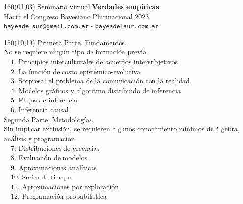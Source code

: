 \documentclass[shownotes,aspectratio=169]{beamer}
\begin{document}
\begin{frame}

\begin{textblock}{160}(01,03)\centering
\textcolor{black!85}{{\large
\large Seminario virtual \textbf{Verdades empíricas} \\[-0.1cm] \footnotesize Hacia el Congreso Bayesiano Plurinacional 2023}} \\ \scriptsize \texttt{bayesdelsur@gmail.com.ar} - \texttt{bayesdelsur.com.ar}
\end{textblock}



\begin{textblock}{150}(10,19)
\normalsize Primera Parte. Fundamentos. \\
\scriptsize No se requiere ningún tipo de formación previa \\[0.15cm] \footnotesize
\ \ $1$. Principios interculturales de acuerdos intersubjetivos \\
\ \ $2$. La función de costo epistémico-evolutiva\\
\ \ $3$. Sorpresa: el problema de la comunicación con la realidad \\
\ \ $4$. Modelos gráficos y algoritmo distribuido de inferencia\\
\ \ $5$. Flujos de inferencia \\
\ \ $6$. Inferencia causal \\[0.4cm]
\normalsize Segunda Parte. Metodologías.\scriptsize \\ Sin implicar exclusión, se requieren algunos conocimiento mínimos de álgebra, análisis y programación. \\[0.15cm] \footnotesize
\ \ $7$. Distribuciones de creencias \\
\ \ $8$. Evaluación de modelos \\
\ \ $9$. Aproximaciones analíticas \\
\ \ $10$. Series de tiempo\\
\ \ $11$. Aproximaciones por exploración \\
\ \ $12$. Programación probabilística\\
\end{textblock}


\end{frame}
\end{document}

